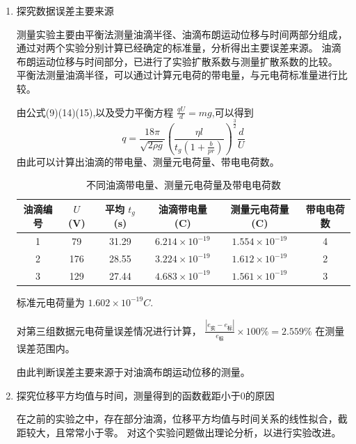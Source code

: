 \documentclass[12pt,a4paper,UTF8]{ctexart}
\begin{document}
\begin{enumerate}
$\overline{N_A}=\frac{N_{A1}+N_{A2}+N_{A3}}{3}=5.758 \times 10^{23}(mol^{-1})$

观察表中数据，与标准值 $6.0221 \times 10^{23}$相比，发现误差主要源于第三组数据。

\item 探究数据误差主要来源

测量实验主要由平衡法测量油滴半径、油滴布朗运动位移与时间两部分组成，通过对两个实验分别计算已经确定的标准量，分析得出主要误差来源。
油滴布朗运动位移与时间部分，已进行了实验扩散系数与测量扩散系数的比较。
平衡法测量油滴半径，可以通过计算元电荷的带电量，与元电荷标准量进行比较。

由公式(9)(14)(15),以及受力平衡方程 $\frac{qU}{d}=mg$,可以得到
\begin{equation}
q=\frac{18\pi}{\sqrt{2\rho g}}\left(\frac{\eta l}{t_{g}(1+\frac{b}{pr})}\right)^\frac{3}{2}\frac{d}{U}
\end{equation}
由此可以计算出油滴的带电量、测量元电荷量、带电电荷数。

\begin{table}[htbp]
  \centering
  \begin{tabular}{cccccc}
    \toprule
    油滴编号 & $U$ (V) & 平均 $t_{g}$ (s) & 油滴带电量(C) &测量元电荷量(C) &带电电荷数\\
    \midrule
    1 &79 &31.29 & $6.214 \times 10^{-19}$ &$1.554 \times 10^{-19}$ &4 \\
    2 &176 &28.55 & $3.224 \times 10^{-19}$ &$1.612 \times 10^{-19}$ &2 \\
    3 &129 &27.44 & $4.683 \times 10^{-19}$ &$1.561 \times 10^{-19}$ &3 \\
    \bottomrule
  \end{tabular}
  \caption{不同油滴带电量、测量元电荷量及带电电荷数}
  \label{tab:data}
\end{table}

标准元电荷量为 $1.602 \times 10^{-19}C$. 

对第三组数据元电荷量误差情况进行计算，
$\frac{|e_{\text{实}} - e_{\text{标}}|}{e_{\text{标}}}\times 100\% =2.559\%$
在测量误差范围内。

由此判断误差主要来源于对油滴布朗运动位移的测量。

\item 探究位移平方均值与时间，测量得到的函数截距小于0的原因

在之前的实验之中，存在部分油滴，位移平方均值与时间关系的线性拟合，截距较大，且常常小于零。
对这个实验问题做出理论分析，以进行实验改进。

\begin{enumerate}[label=\roman*.]


\end{enumerate}
\end{enumerate}
\end{document}
